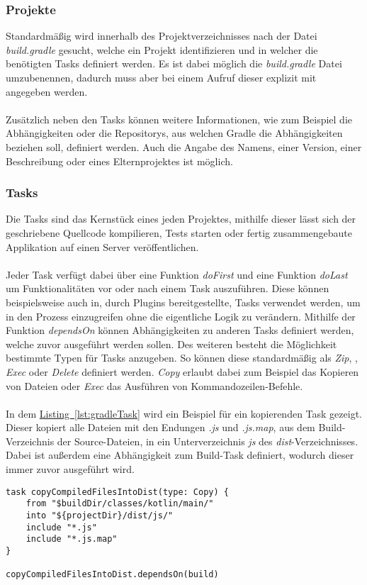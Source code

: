 \subsubsection{Projekte}
Standardmäßig wird innerhalb des Projektverzeichnisses nach der Datei \textit{build.gradle} gesucht, welche ein Projekt identifizieren und in welcher die benötigten Tasks definiert werden. Es ist dabei möglich die \textit{build.gradle} Datei umzubenennen, dadurch muss aber bei einem Aufruf dieser explizit mit angegeben werden.\\
\\
Zusätzlich neben den Tasks können weitere Informationen, wie zum Beispiel die Abhängigkeiten oder die Repositorys, aus welchen Gradle die Abhängigkeiten beziehen soll, definiert werden. Auch die Angabe des Namens, einer Version, einer Beschreibung oder eines Elternprojektes ist möglich.

\subsubsection{Tasks}
Die Tasks sind das Kernstück eines jeden Projektes, mithilfe dieser lässt sich der geschriebene Quellcode kompilieren, Tests starten oder fertig zusammengebaute Applikation auf einen Server veröffentlichen.\\
\\
Jeder Task verfügt dabei über eine Funktion \textit{doFirst} und eine Funktion \textit{doLast} um Funktionalitäten vor oder nach einem Task auszuführen. Diese können beispielsweise auch in, durch Plugins bereitgestellte, Tasks verwendet werden, um in den Prozess einzugreifen ohne die eigentliche Logik zu verändern. Mithilfe der Funktion \textit{dependsOn} können Abhängigkeiten zu anderen Tasks definiert werden, welche zuvor ausgeführt werden sollen. Des weiteren besteht die Möglichkeit bestimmte Typen für Tasks anzugeben. So können diese standardmäßig als \textit{Zip}, , \textit{Exec} oder \textit{Delete} definiert werden. \textit{Copy} erlaubt dabei zum Beispiel das Kopieren von Dateien oder \textit{Exec} das Ausführen von Kommandozeilen-Befehle.\\
\\
In dem \hyperref[lst:gradleTask]{Listing~\ref{lst:gradleTask}} wird ein Beispiel für ein kopierenden Task gezeigt. Dieser kopiert alle Dateien mit den Endungen \textit{.js} und \textit{.js.map}, aus dem Build-Verzeichnis der Source-Dateien, in ein Unterverzeichnis \textit{js} des \textit{dist}-Verzeichnisses. Dabei ist außerdem eine Abhängigkeit zum Build-Task definiert, wodurch dieser immer zuvor ausgeführt wird.
\begin{lstlisting}[style=lstStyleFramed, language=Gradle, caption={Beispiel: Gradle-Task}, label=lst:gradleTask, float, floatplacement=T]
task copyCompiledFilesIntoDist(type: Copy) {
	from "$buildDir/classes/kotlin/main/"
	into "${projectDir}/dist/js/"
	include "*.js"
	include "*.js.map"
}

copyCompiledFilesIntoDist.dependsOn(build)
\end{lstlisting}

